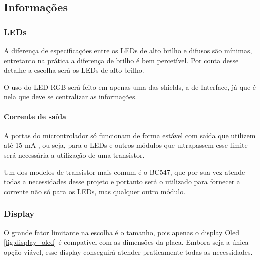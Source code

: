 \subsection{Informações}

\subsubsection*{LEDs}

A diferença de especificações entre os LEDs de alto brilho e difusos são mínimas, entretanto na prática a diferença de brilho é bem percetível. Por  conta desse detalhe a escolha será os LEDs de alto brilho.

O uso do LED RGB será feito em apenas uma das shields, a de Interface, já que é nela que deve se centralizar as informações.

\paragraph*{Corrente de saída}

A portas do microntrolador só funcionam de forma estável com saída que utilizem até 15 mA \cite{TexasInstruments2018} , ou seja, para o LEDs e outros módulos que ultrapassem esse limite será necessária a utilização de uma transistor.

Um dos modelos de transistor mais comum é o BC547, que por sua vez atende todas a necessidades desse projeto e portanto será o utilizado para fornecer a corrente não só para os LEDs, mas qualquer outro módulo.




\subsubsection*{Display}

O grande fator limitante na escolha é o tamanho, pois apenas o display Oled \ref{fig:display_oled} é compatível com as dimensões da placa. Embora seja a única opção viável, esse display conseguirá atender praticamente todas as necessidades.

